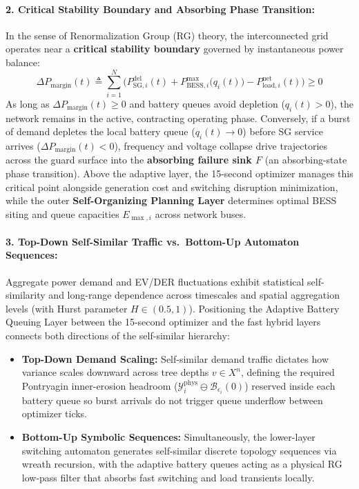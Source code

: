 \documentclass[11pt]{article}
\begin{document}
\paragraph{2. Critical Stability Boundary and Absorbing Phase Transition:}
In the sense of Renormalization Group (RG) theory, the interconnected grid operates near a \textbf{critical stability boundary} governed by instantaneous power balance:
\begin{equation}
\Delta P_{\mathrm{margin}}(t) \triangleq \sum_{i=1}^{N} \Big( P_{\mathrm{SG}, i}^{\mathrm{del}}(t) + P_{\mathrm{BESS}, i}^{\max}\big(q_i(t)\big) - P_{\mathrm{load}, i}^{\mathrm{net}}(t) \Big) \ge 0
\end{equation}
As long as $\Delta P_{\mathrm{margin}}(t) \ge 0$ and battery queues avoid depletion ($q_i(t) > 0$), the network remains in the active, contracting operating phase. Conversely, if a burst of demand depletes the local battery queue ($q_i(t) \to 0$) before SG service arrives ($\Delta P_{\mathrm{margin}}(t) < 0$), frequency and voltage collapse drive trajectories across the guard surface into the \textbf{absorbing failure sink $F$} (an absorbing-state phase transition). Above the adaptive layer, the 15-second optimizer manages this critical point alongside generation cost and switching disruption minimization, while the outer \textbf{Self-Organizing Planning Layer} determines optimal BESS siting and queue capacities $E_{\max, i}$ across network buses.

\paragraph{3. Top-Down Self-Similar Traffic vs.\ Bottom-Up Automaton Sequences:}
Aggregate power demand and EV/DER fluctuations exhibit statistical self-similarity and long-range dependence across timescales and spatial aggregation levels (with Hurst parameter $H \in (0.5, 1)$). Positioning the Adaptive Battery Queuing Layer between the 15-second optimizer and the fast hybrid layers connects both directions of the self-similar hierarchy:
\begin{itemize}
    \item \textbf{Top-Down Demand Scaling:} Self-similar demand traffic dictates how variance scales downward across tree depths $v \in X^n$, defining the required Pontryagin inner-erosion headroom ($\mathcal{Y}_i^{\mathrm{phys}} \ominus \mathcal{B}_{\epsilon_i}(0)$) reserved inside each battery queue so burst arrivals do not trigger queue underflow between optimizer ticks.
    \item \textbf{Bottom-Up Symbolic Sequences:} Simultaneously, the lower-layer switching automaton generates self-similar discrete topology sequences via wreath recursion, with the adaptive battery queues acting as a physical RG low-pass filter that absorbs fast switching and load transients locally.
\end{itemize}
\end{document}
